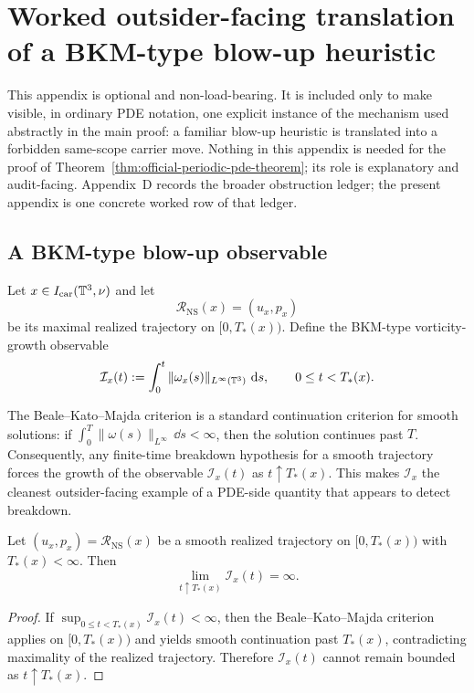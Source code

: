 \clearpage
\section{Worked outsider-facing translation of a BKM-type blow-up heuristic}

This appendix is optional and non-load-bearing. It is included only to make visible, in ordinary PDE
notation, one explicit instance of the mechanism used abstractly in the main proof: a familiar blow-up
heuristic is translated into a forbidden same-scope carrier move. Nothing in this appendix is needed
for the proof of Theorem~\ref{thm:official-periodic-pde-theorem}; its role is explanatory and audit-facing.
Appendix~D records the broader obstruction ledger; the present appendix is one concrete worked row of that ledger.

\subsection{A BKM-type blow-up observable}
Let $x\in I_{\mathrm{car}}(\mathbb{T}^3,\nu)$ and let
\[
\mathcal R_{\mathrm{NS}}(x)=(u_x,p_x)
\]
be its maximal realized trajectory on $[0,T_*(x))$. Define the BKM-type vorticity-growth observable
\[
\mathcal I_x(t):=\int_0^t \|\omega_x(s)\|_{L^\infty(\mathbb{T}^3)}\,\,\mathrm{d} s,
\qquad 0\le t<T_*(x).
\]

\begin{remark}
The Beale--Kato--Majda criterion is a standard continuation criterion for smooth solutions: if
$\int_0^{T}\|\omega(s)\|_{L^\infty}\,\dd s<\infty$, then the solution continues past $T$.
Consequently, any finite-time breakdown hypothesis for a smooth trajectory forces the growth of the
observable $\mathcal I_x(t)$ as $t\uparrow T_*(x)$. This makes $\mathcal I_x$ the cleanest outsider-facing
example of a PDE-side quantity that appears to detect breakdown.
\end{remark}

\begin{lemma}\label{lem:bkm-growth-at-breakdown}
Let $(u_x,p_x)=\mathcal R_{\mathrm{NS}}(x)$ be a smooth realized trajectory on $[0,T_*(x))$ with
$T_*(x)<\infty$. Then
\[
\lim_{t\uparrow T_*(x)} \mathcal I_x(t)=\infty.
\]
\end{lemma}

\begin{proof}
If $\sup_{0\le t<T_*(x)}\mathcal I_x(t)<\infty$, then the Beale--Kato--Majda criterion applies on
$[0,T_*(x))$ and yields smooth continuation past $T_*(x)$, contradicting maximality of the realized
trajectory. Therefore $\mathcal I_x(t)$ cannot remain bounded as $t\uparrow T_*(x)$.
\end{proof}

